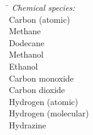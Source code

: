 \begin{tabbing}\hspace*{\lensymb}\=\hspace*{\lenWHAT}\kill
    {\em Chemical species:} \\                                                                       
                                    \> Carbon (atomic)                                                                                                                          \\
                                  \> Methane                                                                                                                                  \\
                               \> Dodecane                                                                                                                                 \\
                                 \> Methanol                                                                                                                                 \\
                                \> Ethanol                                                                                                                                  \\
                                   \> Carbon monoxide                                                                                                                          \\
                                  \> Carbon dioxide                                                                                                                           \\
                                    \> Hydrogen (atomic)                                                                                                                        \\
                                   \> Hydrogen (molecular)                                                                                                                     \\
                                 \> Hydrazine                                                                                                                                \\

\end{tabbing}
